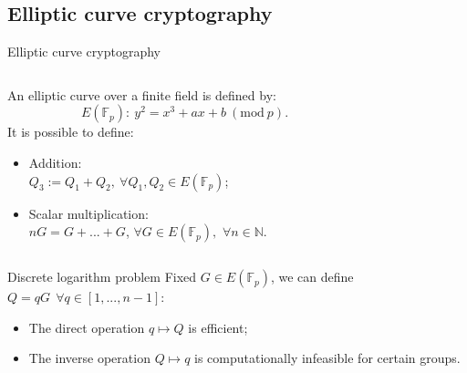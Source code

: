 \documentclass[slidescentered]{beamer}
\begin{document}
		\subsection{Elliptic curve cryptography}
		\begin{frame}{Elliptic curve cryptography}
			\begin{columns}
				\begin{column}{0.5\linewidth}
					An elliptic curve over a finite field is defined by: 
					$$E(\mathbb{F}_p): \ y^2 = x^3 + ax + b \ (\text{mod} \ p).$$
					It is possible to define:
					\begin{itemize}
						\item<2 -> Addition: \\
						$Q_3 := Q_1 + Q_2, \ \forall Q_1, Q_2 \in E(\mathbb{F}_p)$;
						\item<3 -> Scalar multiplication: \\
						$nG = G + ... + G$, $\forall G \in E(\mathbb{F}_p),$ $\forall n \in \mathbb{N}$.
					\end{itemize}
			\end{column}
			\begin{column}{0.6\linewidth}
			\end{column}
		\end{columns}
	\end{frame}

    
    \begin{frame}{Discrete logarithm problem}
    	Fixed $G \in E(\mathbb{F}_p)$, we can define $Q = qG \ \ \forall q \in [1, ..., n - 1]$:
    	\begin{itemize}
    		\item<2-> The direct operation $q \mapsto Q$ is efficient;
    		\item<3-> The inverse operation $Q \mapsto q$ is computationally infeasible for certain groups.
    	\end{itemize}
    	
	\end{frame}
    
\end{document}
